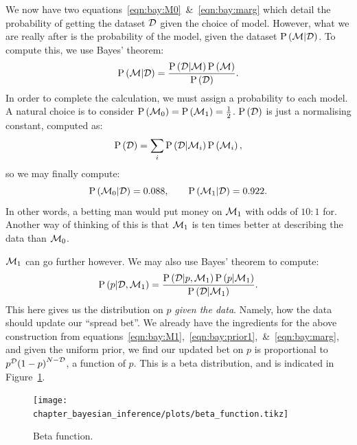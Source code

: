 We now have two equations~\eqref{eqn:bay:M0}~\&~\eqref{eqn:bay:marg} which detail the probability of getting the dataset $\mathcal{D}$ given the choice of model. However, what we are really after is the probability of the model, given the dataset $\mathrm{P}\left(\mathcal{M}\middle|\mathcal{D}\right)$. To compute this, we use Bayes' theorem:
\begin{equation}
  \mathrm{P}\left(\mathcal{M}\middle|\mathcal{D}\right) = \frac{\mathrm{P}\left(\mathcal{D}\middle|\mathcal{M}\right)\mathrm{P}\left(\mathcal{M}\right)}{\mathrm{P}\left(\mathcal{D}\right)}.
  \label{eqn:bay:bay_md}
\end{equation}
In order to complete the calculation, we must assign a probability to each model. A natural choice is to consider $\mathrm{P}\left(\mathcal{M}_0\right)=\mathrm{P}\left(\mathcal{M}_1\right)=\frac{1}{2}$. $\mathrm{P}\left(\mathcal{D}\right)$ is just a normalising constant, computed as:
\begin{equation}
  \mathrm{P}\left(\mathcal{D}\right) = \sum_i \mathrm{P}\left(\mathcal{D}\middle|\mathcal{M}_i\right)\mathrm{P}\left(\mathcal{M}_i\right), 
  \label{eqn:bay:norm}
\end{equation}
so we may finally compute:
\begin{equation}
  \mathrm{P}\left(\mathcal{M}_0\middle|\mathcal{D}\right) = 0.088, \qquad
  \mathrm{P}\left(\mathcal{M}_1\middle|\mathcal{D}\right) = 0.922.
  \label{eqn:bay:comp}
\end{equation}
In other words, a betting man would put money on $\mathcal{M}_1$ with odds of $10:1$ for. Another way of thinking of this is that $\mathcal{M}_1$ is ten times better at describing the data than $\mathcal{M}_0$.

$\mathcal{M}_1$ can go further however. We may also use Bayes' theorem to compute:
\begin{equation}
  \mathrm{P}\left(p\middle|\mathcal{D},\mathcal{M}_1\right) = \frac{\mathrm{P}\left(\mathcal{D}\middle|p,\mathcal{M}_1\right)\mathrm{P}\left(p\middle|\mathcal{M}_1\right)}{\mathrm{P}\left(\mathcal{D}\middle|\mathcal{M}_1\right)}.
  \label{eqn:bay:bay_p}
\end{equation}
This here gives us the distribution on $p$ {\em given the data}. Namely, how the data should update our ``spread bet''. We already have the ingredients for the above construction from equations~\eqref{eqn:bay:M1},~\eqref{eqn:bay:prior1},~\&~\eqref{eqn:bay:marg}, and given the uniform prior, we find our updated bet on $p$ is proportional to $p^{\mathcal{D}}{(1-p)}^{N-\mathcal{D}}$, a function of $p$. This is a beta distribution, and is indicated in Figure~\ref{fig:bay:beta}.

\begin{figure}[ht]
  \centering
  \ifdefined\lightweight{}
  \else
  \texttt{[image: chapter\_bayesian\_inference/plots/beta\_function.tikz]}
  \fi
  \caption{%
  Beta function.\label{fig:bay:beta}
}
\end{figure}

